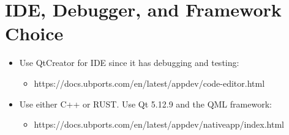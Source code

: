 \section{IDE, Debugger, and Framework Choice}


\begin{itemize}
	\item Use QtCreator for IDE since it has debugging and testing:
	\begin{itemize}
		\item https://docs.ubports.com/en/latest/appdev/code-editor.html
	\end{itemize}
\end{itemize}


\begin{itemize}
	\item Use either C++ or RUST. Use Qt 5.12.9 and the QML framework:
	\begin{itemize}
		\item https://docs.ubports.com/en/latest/appdev/nativeapp/index.html
	\end{itemize}
\end{itemize}
